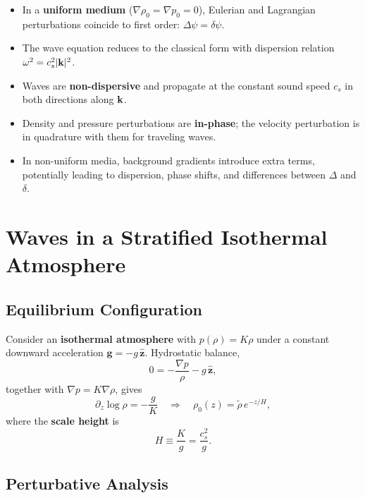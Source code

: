 \begin{tcolorbox}[colback=yellow!5!white, colframe=yellow!50!black, title=Takeaways]
\begin{itemize}
    \item In a \textbf{uniform medium} ($\nabla \rho_0 = \nabla p_0 = 0$), Eulerian and Lagrangian perturbations coincide to first order: $\Delta\psi = \delta\psi$.
    \item The wave equation reduces to the classical form with dispersion relation $\omega^2 = c_s^2 |{\bf k}|^2$.
    \item Waves are \textbf{non-dispersive} and propagate at the constant sound speed $c_s$ in both directions along ${\bf k}$.
    \item Density and pressure perturbations are \textbf{in-phase}; the velocity perturbation is in quadrature with them for traveling waves.
    \item In non-uniform media, background gradients introduce extra terms, potentially leading to dispersion, phase shifts, and differences between $\Delta$ and $\delta$.
\end{itemize}
\end{tcolorbox}

\section{Waves in a Stratified Isothermal Atmosphere}

\subsection*{Equilibrium Configuration}

Consider an \textbf{isothermal atmosphere} with $p(\rho) = K\rho$ under a constant downward acceleration $\mathbf{g} = - g \, \hat{\mathbf{z}}$. Hydrostatic balance,
\[
0 = -\frac{\nabla p}{\rho} - g \, \hat{\mathbf{z}},
\]
together with $\nabla p = K \nabla \rho$, gives
\[
\partial_z \log \rho = -\frac{g}{K}
\quad\Rightarrow\quad
\rho_0(z) = \tilde{\rho} \, e^{-z/H},
\]
where the \textbf{scale height} is
\[
H \equiv \frac{K}{g} = \frac{c_s^2}{g}.
\]

\subsection*{Perturbative Analysis}

